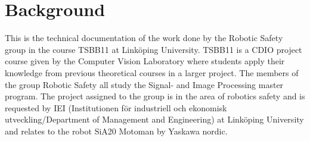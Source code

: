\section{Background}
This is the technical documentation of the work done by the Robotic Safety group in the course TSBB11 at Linköping University. TSBB11 is a CDIO project course given by the Computer Vision Laboratory where students apply their knowledge from previous theoretical courses in a larger project. The members of the group Robotic Safety all study the Signal- and Image Processing master program. 
The project assigned to the group is in the area of robotics safety and is requested by IEI (Institutionen för industriell och ekonomisk utveckling/Department of Management and Engineering) at Linköping University and relates to the robot SiA20 Motoman by Yaskawa nordic. 